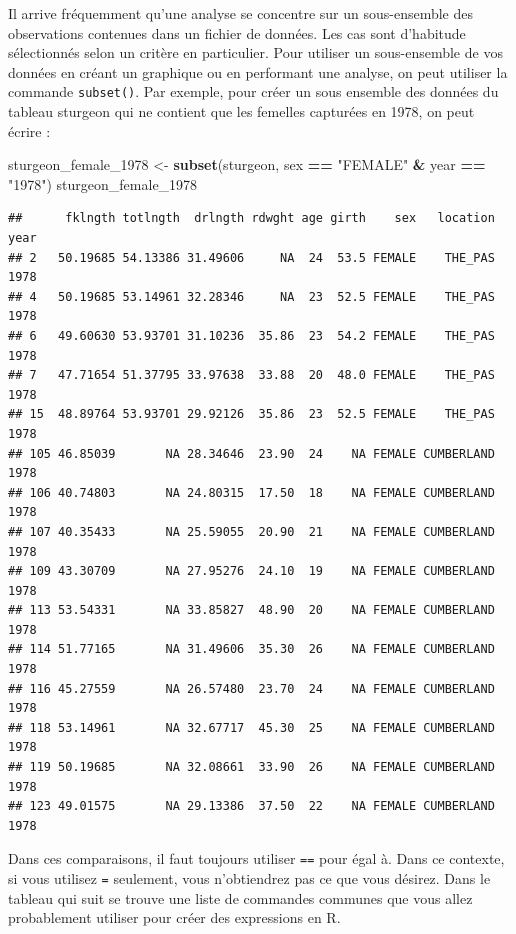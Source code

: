 \documentclass[
  12pt,
]{book}
\makeatletter
\newenvironment{Shaded}{\begin{snugshade}}{\end{snugshade}}
\newcommand{\DecValTok}[1]{\textcolor[rgb]{0.00,0.00,0.81}{#1}}
\newcommand{\KeywordTok}[1]{\textcolor[rgb]{0.13,0.29,0.53}{\textbf{#1}}}
\newcommand{\NormalTok}[1]{#1}
\newcommand{\OperatorTok}[1]{\textcolor[rgb]{0.81,0.36,0.00}{\textbf{#1}}}
\newcommand{\StringTok}[1]{\textcolor[rgb]{0.31,0.60,0.02}{#1}}
\newenvironment{kframe}{%
\medskip{}
\setlength{\fboxsep}{.8em}
\def\at@end@of@kframe{}%
\ifinner\ifhmode%
 \def\at@end@of@kframe{\end{minipage}}%
 \begin{minipage}{\columnwidth}%
\fi\fi%
\def\FrameCommand##1{\hskip\@totalleftmargin \hskip-\fboxsep
\colorbox{incolor}{##1}\hskip-\fboxsep
    \hskip-\linewidth \hskip-\@totalleftmargin \hskip\columnwidth}%
\MakeFramed {\advance\hsize-\width
  \@totalleftmargin\z@ \linewidth\hsize
  \@setminipage}}%
{\par\unskip\endMakeFramed%
\at@end@of@kframe}
\newenvironment{rmdblock}[1]
 {
 \begin{itemize}
 \renewcommand{\labelitemi}{
   \raisebox{-.7\height}[0pt][0pt]{
     {\setkeys{Gin}{width=3em,keepaspectratio}\texttt{[image: images/\#1]}}
   }
 }
 \begin{kframe}
 \setlength{\fboxsep}{1em}
 \item
 }
 {
 \end{kframe}
 \end{itemize}
 }
\newenvironment{rmdcaution}
  {\begin{rmdblock}{caution}}
  {\end{rmdblock}}
\makeatother
\begin{document}
Il arrive fréquemment qu'une analyse se concentre sur un sous-ensemble des observations contenues dans un fichier de données.
Les cas sont d'habitude sélectionnés selon un critère en particulier.
Pour utiliser un sous-ensemble de vos données en créant un graphique ou en performant une analyse, on peut utiliser la commande \texttt{subset()}.
Par exemple, pour créer un sous ensemble des données du tableau sturgeon qui ne contient que les femelles capturées en 1978, on peut écrire :

\begin{Shaded}
\begin{Highlighting}[]
\NormalTok{sturgeon\_female\_}\DecValTok{1978}\NormalTok{ \textless{}{-}}\StringTok{ }\KeywordTok{subset}\NormalTok{(sturgeon, sex }\OperatorTok{==}\StringTok{ "FEMALE"} \OperatorTok{\&}\StringTok{ }\NormalTok{year }\OperatorTok{==}\StringTok{ "1978"}\NormalTok{)}
\NormalTok{sturgeon\_female\_}\DecValTok{1978}
\end{Highlighting}
\end{Shaded}

\begin{verbatim}
##      fklngth totlngth  drlngth rdwght age girth    sex   location year
## 2   50.19685 54.13386 31.49606     NA  24  53.5 FEMALE    THE_PAS 1978
## 4   50.19685 53.14961 32.28346     NA  23  52.5 FEMALE    THE_PAS 1978
## 6   49.60630 53.93701 31.10236  35.86  23  54.2 FEMALE    THE_PAS 1978
## 7   47.71654 51.37795 33.97638  33.88  20  48.0 FEMALE    THE_PAS 1978
## 15  48.89764 53.93701 29.92126  35.86  23  52.5 FEMALE    THE_PAS 1978
## 105 46.85039       NA 28.34646  23.90  24    NA FEMALE CUMBERLAND 1978
## 106 40.74803       NA 24.80315  17.50  18    NA FEMALE CUMBERLAND 1978
## 107 40.35433       NA 25.59055  20.90  21    NA FEMALE CUMBERLAND 1978
## 109 43.30709       NA 27.95276  24.10  19    NA FEMALE CUMBERLAND 1978
## 113 53.54331       NA 33.85827  48.90  20    NA FEMALE CUMBERLAND 1978
## 114 51.77165       NA 31.49606  35.30  26    NA FEMALE CUMBERLAND 1978
## 116 45.27559       NA 26.57480  23.70  24    NA FEMALE CUMBERLAND 1978
## 118 53.14961       NA 32.67717  45.30  25    NA FEMALE CUMBERLAND 1978
## 119 50.19685       NA 32.08661  33.90  26    NA FEMALE CUMBERLAND 1978
## 123 49.01575       NA 29.13386  37.50  22    NA FEMALE CUMBERLAND 1978
\end{verbatim}

\begin{rmdcaution}
Dans ces comparaisons, il faut toujours utiliser \texttt{==} pour égal à.
Dans ce contexte, si vous utilisez \texttt{=} seulement, vous n'obtiendrez pas ce que vous désirez.
Dans le tableau qui suit se trouve une liste de commandes communes que vous allez probablement utiliser pour créer des expressions en R.
\end{rmdcaution}
\end{document}
